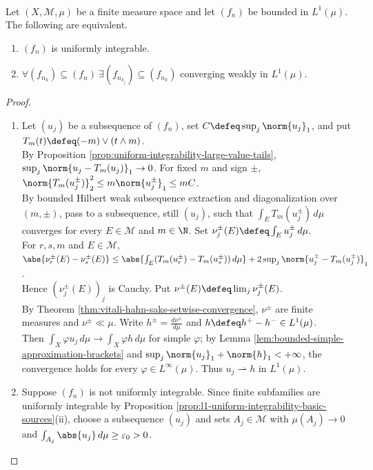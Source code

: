 \begin{theorem} \label{thm:dunford-pettis-l1-finite-measure} \\
Let $(X,\mathcal{M},\mu)$ be a finite measure space and let $(f_n)$ be bounded in $L^1(\mu)$. The following are equivalent.
\begin{enumerate}[label=(\roman*)]
\setlength{\itemsep}{0pt}
\item $(f_n)$ is uniformly integrable.
\item $\forall(f_{n_k})\subseteq(f_n)\ \exists(f_{n_{k_j}})\subseteq(f_{n_k})$ converging weakly in $L^1(\mu)$.
\end{enumerate}
\begin{proof}
\begin{enumerate}[label=\roman*.]
\setlength{\itemsep}{0pt}
\item[$(\Rightarrow)$] Let $(u_j)$ be a subsequence of $(f_n)$, set $C\defeq\sup_j\norm{u_j}_1$, and put $T_m(t)\defeq(-m)\vee(t\wedge m)$.\\
By Proposition \ref{prop:uniform-integrability-large-value-tails}, $\sup_j\norm{u_j-T_m(u_j)}_1\to0$. For fixed $m$ and sign $\pm$, $\norm{T_m(u_j^\pm)}_2^2\leq m\norm{u_j^\pm}_1\leq mC$.\\
By bounded Hilbert weak subsequence extraction and diagonalization over $(m,\pm)$, pass to a subsequence, still $(u_j)$, such that $\int_ET_m(u_j^\pm)\,d\mu$ converges for every $E\in\mathcal M$ and $m\in\N$. Set $\nu_j^\pm(E)\defeq\int_Eu_j^\pm\,d\mu$.\\
For $r,s,m$ and $E\in\mathcal M$, $\abs{\nu_r^\pm(E)-\nu_s^\pm(E)}\leq\abs{\int_E(T_m(u_r^\pm)-T_m(u_s^\pm))\,d\mu}+2\sup_j\norm{u_j^\pm-T_m(u_j^\pm)}_1$.\\
Hence $(\nu_j^\pm(E))_j$ is Cauchy. Put $\nu^\pm(E)\defeq\lim_j\nu_j^\pm(E)$.\\
By Theorem \ref{thm:vitali-hahn-saks-setwise-convergence}, $\nu^\pm$ are finite measures and $\nu^\pm\ll\mu$. Write $h^\pm=\frac{d\nu^\pm}{d\mu}$ and $h\defeq h^+-h^-\in L^1(\mu)$.\\
Then $\int_X\varphi u_j\,d\mu\to\int_X\varphi h\,d\mu$ for simple $\varphi$; by Lemma \ref{lem:bounded-simple-approximation-brackets} and $\sup_j\norm{u_j}_1+\norm{h}_1<+\infty$, the convergence holds for every $\varphi\in L^\infty(\mu)$. Thus $u_j\rightharpoonup h$ in $L^1(\mu)$.
\item[$(\Leftarrow)$] Suppose $(f_n)$ is not uniformly integrable. Since finite subfamilies are uniformly integrable by Proposition \ref{prop:l1-uniform-integrability-basic-sources}(ii), choose a subsequence $(u_j)$ and sets $A_j\in\mathcal M$ with $\mu(A_j)\to0$ and $\int_{A_j}\abs{u_j}\,d\mu\geq\varepsilon_0>0$.\\

\end{enumerate}
\end{proof}
\end{theorem}

